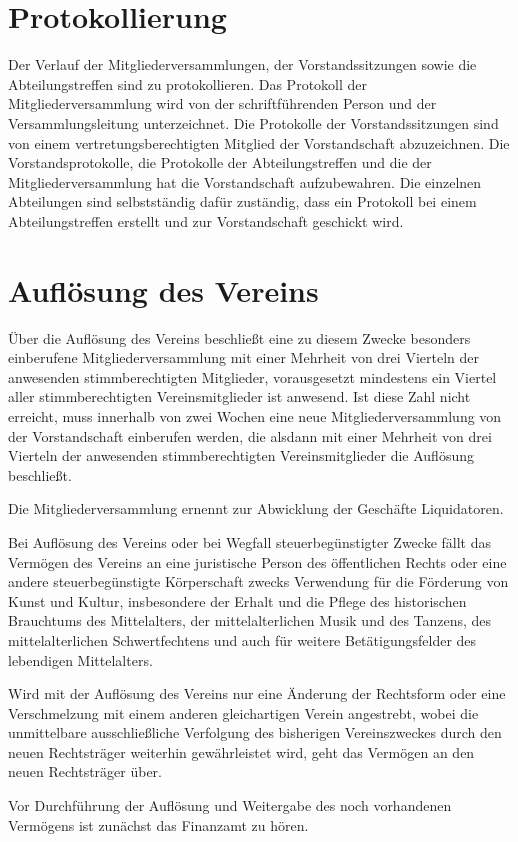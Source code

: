 \documentclass[10pt,a4paper]{article}
\begin{document}
\section{Protokollierung}
Der Verlauf der Mitgliederversammlungen, der Vorstandssitzungen sowie die Abteilungstreffen sind zu
protokollieren. Das Protokoll der Mitgliederversammlung wird von der schriftführenden Person und der
Versammlungsleitung unterzeichnet. Die Protokolle der Vorstandssitzungen sind von einem
vertretungsberechtigten Mitglied der Vorstandschaft abzuzeichnen. Die Vorstandsprotokolle, die Protokolle der
Abteilungstreffen und die der Mitgliederversammlung hat die Vorstandschaft aufzubewahren.
Die einzelnen Abteilungen sind selbstständig dafür zuständig, dass ein Protokoll bei einem Abteilungstreffen
erstellt und zur Vorstandschaft geschickt wird.
\section{Auflösung des Vereins}
Über die Auflösung des Vereins beschließt eine zu diesem Zwecke besonders einberufene
Mitgliederversammlung mit einer Mehrheit von drei Vierteln der anwesenden stimmberechtigten Mitglieder,
vorausgesetzt mindestens ein Viertel aller stimmberechtigten Vereinsmitglieder ist anwesend.
Ist diese Zahl nicht erreicht, muss innerhalb von zwei Wochen eine neue Mitgliederversammlung von der
Vorstandschaft einberufen werden, die alsdann mit einer Mehrheit von drei Vierteln der anwesenden
stimmberechtigten Vereinsmitglieder die Auflösung beschließt.

Die Mitgliederversammlung ernennt zur Abwicklung der Geschäfte Liquidatoren.

Bei Auflösung des Vereins oder bei Wegfall steuerbegünstigter Zwecke fällt das Vermögen des Vereins an eine
juristische Person des öffentlichen Rechts oder eine andere steuerbegünstigte Körperschaft zwecks Verwendung
für die Förderung von Kunst und Kultur, insbesondere der Erhalt und die Pflege des historischen Brauchtums des
Mittelalters, der mittelalterlichen Musik und des Tanzens, des mittelalterlichen Schwertfechtens und auch für
weitere Betätigungsfelder des lebendigen Mittelalters.

Wird mit der Auflösung des Vereins nur eine Änderung der Rechtsform oder eine Verschmelzung mit einem
anderen gleichartigen Verein angestrebt, wobei die unmittelbare ausschließliche Verfolgung des bisherigen
Vereinszweckes durch den neuen Rechtsträger weiterhin gewährleistet wird, geht das Vermögen an den neuen
Rechtsträger über.

Vor Durchführung der Auflösung und Weitergabe des noch vorhandenen Vermögens ist zunächst das Finanzamt
zu hören.
\end{document}
